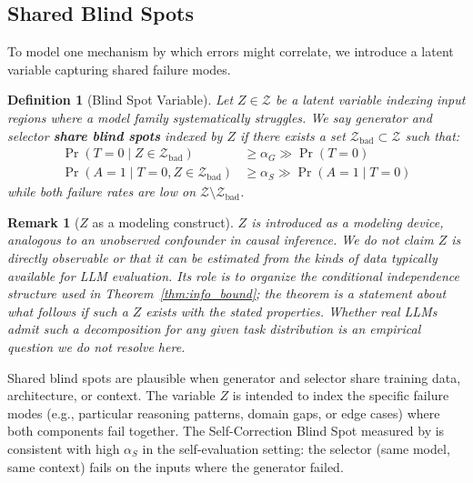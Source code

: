 \documentclass[11pt]{article}
\newtheorem{definition}[theorem]{Definition}
\newtheorem{remark}[theorem]{Remark}
\begin{document}
\subsection{Shared Blind Spots}

To model one mechanism by which errors might correlate, we introduce a latent variable capturing shared failure modes.

\begin{definition}[Blind Spot Variable]
Let $Z \in \mathcal{Z}$ be a latent variable indexing input regions where a model family systematically struggles. We say generator and selector \textbf{share blind spots} indexed by $Z$ if there exists a set $\mathcal{Z}_{\mathrm{bad}} \subset \mathcal{Z}$ such that:
\begin{align}
\Pr(T = 0 \mid Z \in \mathcal{Z}_{\mathrm{bad}}) &\geq \alpha_G \gg \Pr(T = 0) \\
\Pr(A = 1 \mid T = 0, Z \in \mathcal{Z}_{\mathrm{bad}}) &\geq \alpha_S \gg \Pr(A = 1 \mid T = 0)
\end{align}
while both failure rates are low on $\mathcal{Z} \setminus \mathcal{Z}_{\mathrm{bad}}$.
\end{definition}

\begin{remark}[$Z$ as a modeling construct]
$Z$ is introduced as a modeling device, analogous to an unobserved confounder in causal inference. We do not claim $Z$ is directly observable or that it can be estimated from the kinds of data typically available for LLM evaluation. Its role is to organize the conditional independence structure used in Theorem~\ref{thm:info_bound}; the theorem is a statement about what follows \emph{if} such a $Z$ exists with the stated properties. Whether real LLMs admit such a decomposition for any given task distribution is an empirical question we do not resolve here.
\end{remark}

Shared blind spots are plausible when generator and selector share training data, architecture, or context. The variable $Z$ is intended to index the specific failure modes (e.g., particular reasoning patterns, domain gaps, or edge cases) where both components fail together. The Self-Correction Blind Spot measured by \citet{tsui2025selfcorrection} is consistent with high $\alpha_S$ in the self-evaluation setting: the selector (same model, same context) fails on the inputs where the generator failed.

\end{document}
